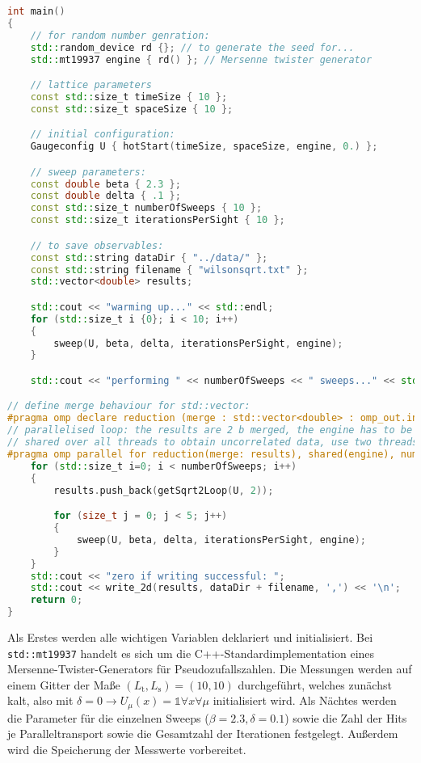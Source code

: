 \begin{lstlisting}[language=C++,float,caption=Ein Beispiel für main.cpp,label=lst:main]
int main()
{
    // for random number genration:
    std::random_device rd {}; // to generate the seed for...
    std::mt19937 engine { rd() }; // Mersenne twister generator

    // lattice parameters
    const std::size_t timeSize { 10 };
    const std::size_t spaceSize { 10 };

    // initial configuration:
    Gaugeconfig U { hotStart(timeSize, spaceSize, engine, 0.) };

    // sweep parameters:
    const double beta { 2.3 };
    const double delta { .1 };
    const std::size_t numberOfSweeps { 10 };
    const std::size_t iterationsPerSight { 10 };

    // to save observables:
    const std::string dataDir { "../data/" };
    const std::string filename { "wilsonsqrt.txt" };
    std::vector<double> results;

    std::cout << "warming up..." << std::endl;
    for (std::size_t i {0}; i < 10; i++)
    {
        sweep(U, beta, delta, iterationsPerSight, engine);
    }

    std::cout << "performing " << numberOfSweeps << " sweeps..." << std::endl;

// define merge behaviour for std::vector:
#pragma omp declare reduction (merge : std::vector<double> : omp_out.insert(omp_out.end(), omp_in.begin(), omp_in.end()))
// parallelised loop: the results are 2 b merged, the engine has to be
// shared over all threads to obtain uncorrelated data, use two threads
#pragma omp parallel for reduction(merge: results), shared(engine), num_threads(2)
    for (std::size_t i=0; i < numberOfSweeps; i++)
    {
        results.push_back(getSqrt2Loop(U, 2));

        for (size_t j = 0; j < 5; j++)
        {
            sweep(U, beta, delta, iterationsPerSight, engine);
        }
    }
    std::cout << "zero if writing successful: ";
    std::cout << write_2d(results, dataDir + filename, ',') << '\n';
    return 0;
}
\end{lstlisting}

Als Erstes werden alle wichtigen Variablen deklariert und initialisiert. Bei
\texttt{std::mt19937} handelt es sich um die C++-Standardimplementation eines
Mersenne-Twister-Generators für Pseudozufallszahlen. Die Messungen werden auf
einem Gitter der Maße $(L_\text{t}, L_\text{s}) = (10,10)$ durchgeführt, welches
zunächst kalt, also mit
$\delta = 0 \rightarrow U_\mu(x) = \mathds{1} \forall x \forall \mu$
initialisiert wird. Als Nächtes werden die
Parameter für die einzelnen Sweeps ($\beta = 2.3, \delta = 0.1$) sowie die
Zahl der Hits je Paralleltransport sowie die Gesamtzahl der Iterationen
festgelegt. Außerdem wird die Speicherung der Messwerte vorbereitet.

